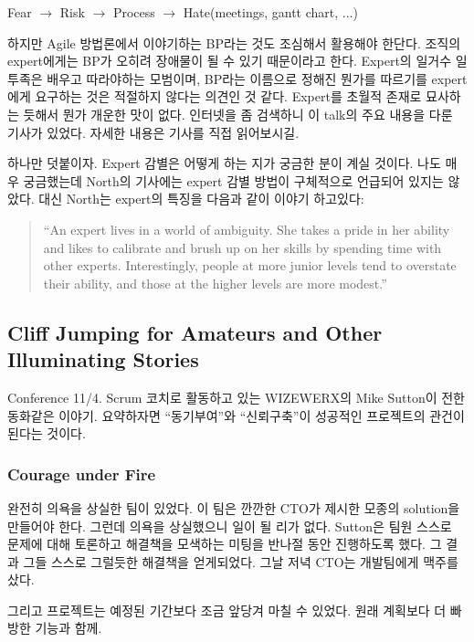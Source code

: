 \documentclass[11pt]{article}
\begin{document}
\begin{center}
Fear $\rightarrow$ Risk $\rightarrow$ Process $\rightarrow$ Hate(meetings, gantt chart, ...)
\end{center}

하지만 Agile 방법론에서 이야기하는 BP라는 것도 조심해서 활용해야 한단다. 
조직의 expert에게는 BP가 오히려 장애물이 될 수 있기 때문이라고 한다.
Expert의 일거수 일투족은 배우고 따라야하는 모범이며, 
BP라는 이름으로 정해진 뭔가를 따르기를 expert에게 요구하는 것은 
적절하지 않다는 의견인 것 같다. Expert를 초월적 존재로 묘사하는 듯해서 뭔가 
개운한 맛이 없다. 
인터넷을 좀 검색하니 이 talk의 주요 내용을 다룬 
기사\cite{north}가 있었다. 자세한 내용은 기사를 직접 읽어보시길.

하나만 덧붙이자. Expert 감별은 어떻게 하는 지가 궁금한 분이 계실 것이다.
나도 매우 궁금했는데 North의 기사\cite{north}에는 expert 감별 방법이
구체적으로 언급되어 있지는 않았다. 대신 North는 expert의 특징을 다음과 같이 
이야기 하고있다:
\begin{quote}
``An expert lives in a world of ambiguity. She takes a pride in her ability and 
likes to calibrate and brush up on her skills by spending time with other 
experts. Interestingly, people at more junior levels tend to overstate their 
ability, and those at the higher levels are more modest.''
\end{quote}

\subsection{Cliff Jumping for Amateurs and Other
  Illuminating Stories}

Conference 11/4. Scrum 코치로 활동하고 있는 WIZEWERX의 Mike Sutton이 전한 
동화같은 이야기. 요약하자면 ``동기부여''와 ``신뢰구축''이 성공적인 프로젝트의 
관건이 된다는 것이다.
 
\subsubsection{Courage under Fire}
 
완전히 의욕을 상실한 팀이 있었다. 이 팀은 깐깐한 CTO가 제시한 모종의 solution을
만들어야 한다. 그런데 의욕을 상실했으니 일이 될 리가 없다. Sutton은
팀원 스스로 문제에 대해 토론하고 해결책을 모색하는 미팅을 반나절 동안
진행하도록 했다. 그 결과 그들 스스로 그럴듯한 해결책을 얻게되었다. 그날
저녁 CTO는 개발팀에게 맥주를 샀다.
 
그리고 프로젝트는 예정된 기간보다 조금 앞당겨 마칠 수 
있었다. 원래 계획보다 더 빠방한 기능과 함께.
\end{document}

